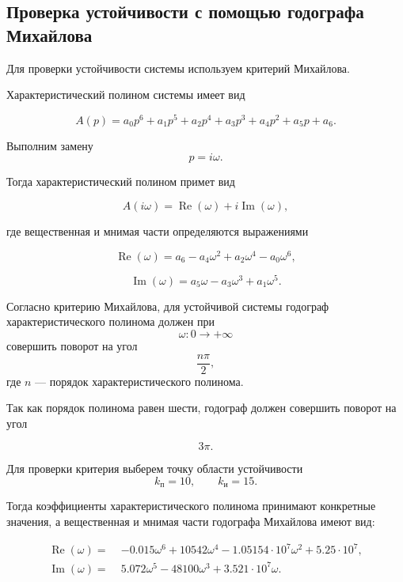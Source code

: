\subsection{Проверка устойчивости с помощью годографа Михайлова}

Для проверки устойчивости системы используем критерий
Михайлова.

Характеристический полином системы имеет вид

\begin{equation}
A(p)=a_0p^6+a_1p^5+a_2p^4+a_3p^3+a_4p^2+a_5p+a_6.
\end{equation}

Выполним замену
\[
p=i\omega.
\]

Тогда характеристический полином примет вид

\begin{equation}
A(i\omega)=\operatorname{Re}(\omega)+
i\operatorname{Im}(\omega),
\end{equation}

где вещественная и мнимая части определяются выражениями

\begin{equation}
\operatorname{Re}(\omega)=
a_6-a_4\omega^2+a_2\omega^4-a_0\omega^6,
\end{equation}

\begin{equation}
\operatorname{Im}(\omega)=
a_5\omega-a_3\omega^3+a_1\omega^5.
\end{equation}

Согласно критерию Михайлова, для устойчивой системы
годограф характеристического полинома должен при
\[
\omega:0\to+\infty
\]
совершить поворот на угол
\[
\frac{n\pi}{2},
\]
где \(n\) — порядок характеристического полинома.

Так как порядок полинома равен шести,
годограф должен совершить поворот на угол

\[
3\pi.
\]

Для проверки критерия выберем точку области устойчивости
\[
k_{\text{п}}=10,
\qquad
k_{\text{и}}=15.
\]

Тогда коэффициенты характеристического полинома принимают
конкретные значения, а вещественная и мнимая части
годографа Михайлова имеют вид:

\begin{equation}
\begin{aligned}
\operatorname{Re}(\omega) =\;&
-0.015\omega^6
+ 10542\omega^4
- 1.05154 \cdot 10^7 \omega^2
+ 5.25 \cdot 10^7,
\\
\operatorname{Im}(\omega) =\;&
5.072\omega^5
- 48100\omega^3
+ 3.521 \cdot 10^7 \omega.
\end{aligned}
\end{equation}


